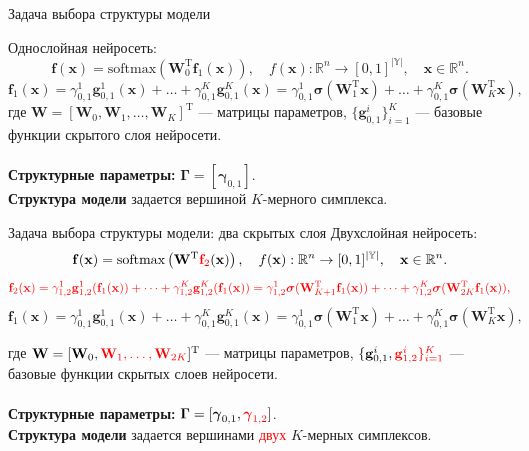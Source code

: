 \documentclass[usenames,dvipsnames,11pt,pdf,utf8,russian,aspectratio=169]{beamer}
\begin{document}
\begin{frame}{Задача выбора структуры модели}

Однослойная нейросеть:
\[
    \mathbf{f}(\mathbf{x}) = \text{softmax}\left(\mathbf{W}_0^\text{T}\mathbf{f}_1(\mathbf{x})\right), \quad f(\mathbf{x}): \mathbb{R}^n \to [0,1]^{|\mathbb{Y}|}, \quad \mathbf{x} \in \mathbb{R}^n.
\]
\[
\]
\[
\mathbf{f}_1(\mathbf{x}) = {\gamma}_{0,1}^{1}\mathbf{g}_{0,1}^{1}(\mathbf{x})+\dots+{\gamma}_{0,1}^{K}\mathbf{g}_{0,1}^{K}(\mathbf{x})= {\gamma}_{0,1}^{1}\boldsymbol{\sigma}(\mathbf{W}_1^\text{T}\mathbf{x}) + \dots +  {\gamma}_{0,1}^{K}\boldsymbol{\sigma}(\mathbf{W}_K^\text{T}\mathbf{x}),
\]
где $\mathbf{W} = [\mathbf{W}_0,\mathbf{W}_1, \dots, \mathbf{W}_K]^\text{T}$ --- матрицы параметров, $\{\mathbf{g}^{i}_{0,1}\}_{i=1}^K$ --- базовые функции скрытого слоя нейросети.~\\~\\

\textbf{Структурные параметры:}  $\boldsymbol{\Gamma} = [\boldsymbol{\gamma}_{0,1}]$.\\
\textbf{Структура модели} задается вершиной $K$-мерного симплекса.
    
\end{frame}

\begin{frame}{Задача выбора структуры модели: два скрытых слоя}
Двухслойная нейросеть:
\[
    \mathbf{f}(\mathbf{x}) = \text{softmax}\left(\mathbf{W}^\text{T}\textcolor{red}{\mathbf{f}_2}(\mathbf{x})\right), \quad f(\mathbf{x}): \mathbb{R}^n \to [0,1]^{|\mathbb{Y}|}, \quad \mathbf{x} \in \mathbb{R}^n.
\]
\[
\textcolor{red}{
\mathbf{f}_2(\mathbf{x}) = {\gamma}_{1,2}^{1}\mathbf{g}_{1,2}^{1}(\mathbf{f}_1(\mathbf{x}))+\dots+{\gamma}_{1,2}^{K}\mathbf{g}_{1,2}^{K}(\mathbf{f}_1(\mathbf{x}))= {\gamma}_{1,2}^{1}\boldsymbol{\sigma}(\mathbf{W}_{K+1}^\text{T}\mathbf{f}_1(\mathbf{x})) + \dots +  {\gamma}_{1,2}^{K}\boldsymbol{\sigma}(\mathbf{W}_{2K}^\text{T}\mathbf{f}_1(\mathbf{x})),}
\]
\[
\mathbf{f}_1(\mathbf{x}) = {\gamma}_{0,1}^{1}\mathbf{g}_{0,1}^{1}(\mathbf{x})+\dots+{\gamma}_{0,1}^{K}\mathbf{g}_{0,1}^{K}(\mathbf{x})= {\gamma}_{0,1}^{1}\boldsymbol{\sigma}(\mathbf{W}_1^\text{T}\mathbf{x}) + \dots +  {\gamma}_{0,1}^{K}\boldsymbol{\sigma}(\mathbf{W}_K^\text{T}\mathbf{x}),
\]

где $\mathbf{W} = [\mathbf{W}_0,\textcolor{red}{\mathbf{W}_1, \dots, \mathbf{W}_{2K}}]^{\text{T}}$ --- матрицы параметров, $\{\mathbf{g}^{i}_{0,1}, \textcolor{red}{\mathbf{g}^{i}_{1,2}\}_{i=1}^K}$ --- базовые функции скрытых слоев нейросети.~\\~\\

\textbf{Структурные параметры:} $\boldsymbol{\Gamma} = [\boldsymbol{\gamma}_{0,1}, \textcolor{red}{\boldsymbol{\gamma}_{1,2}}]$.\\
\textbf{Структура модели} задается вершинами \textcolor{red}{двух} $K$-мерных симплексов.
\end{frame}
        
\end{document}
